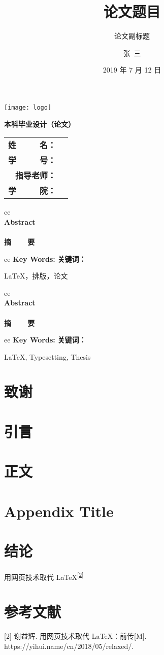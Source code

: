 \documentclass[12pt]{ctexrep}
\title{论文题目}
\subtitle{论文副标题}
\author{张\ 三}
\date{2019 年 7 月 12 日}
\makeatletter
\renewenvironment{abstract}[1]{
	\pagestyle{empty}
    \def\invalue{#1}
    \def\english{e}
    \begin{center}
        \ifx\invalue\english
        	{\Large \bfseries \@etitle} \\
        	\vspace{1.5em}
            {\LARGE \bfseries Abstract} \\
        \else
		    {\Large \bfseries \@title} \\
        	\vspace{1.5em}
            {\LARGE \bfseries 摘~~~~要} \\
        \fi
        \vspace{0.5em}
    \end{center}
}{
	\cleardoublepage
}
\newenvironment{keywords}[1]{
	\par
	\vspace{1cm}
	\noindent
	\def\invalue{#1}
	\def\english{e}
	\ifx\invalue\english
		{\bfseries Key Words: }
	\else
		{\bfseries 关键词： }
	\fi
}{}
\renewcommand{\maketitle}{
\begin{titlepage}
   \begin{center}
       \vspace*{1cm}\par
       {\Huge\bfseries \@title}\par
       \vspace{0.5cm}
       {\LARGE \@subtitle }\par
       \texttt{[image: logo]}\par
       \vspace{1.5cm}
       \vspace{1cm}
       {\LARGE \bfseries 本科毕业设计（论文）}\par
       \vspace{0.8cm}
	   \large
	   \begin{tabular}[h]{rc}
       \textbf{姓~~~~~名：} & \@author\\
	   \textbf{学~~~~~号：} & \@xuehao\\
	   \textbf{指导老师：} & \@supervisor\\
	   \textbf{学~~~~~院：} & \@college
	   \end{tabular}
	   \vfill
       \@date
   \end{center}
   \cleardoublepage
   \phantom{s}
   \thispagestyle{empty}
\end{titlepage}
}
\makeatother
\begin{document}
\maketitle

\begin{abstract}{c}
\zhlipsum[1]

\begin{keywords}{c}
\LaTeX{}，排版，论文
\end{keywords}
\end{abstract}

\begin{abstract}{e}
\lipsum[1]
\begin{keywords}{e}
\LaTeX{}, Typesetting, Thesis
\end{keywords}
\end{abstract}
 
\chapter*{致谢}
\zhlipsum[1]
 
\tableofcontents

\chapter{引言}
\zhlipsum[1-2]

\chapter{正文}
\zhlipsum[1-15]

\appendix
\chapter{Appendix Title}
\zhlipsum[1]

\chapter{结论}
用网页技术取代 \LaTeX{}\textsuperscript{{[}\protect\hyperlink{ref-weborlatex}{2}{]}}

\chapter*{参考文献}
\leavevmode\hypertarget{ref-weborlatex}{}%
{[}2{]} 谢益辉. 用网页技术取代 LaTeX：前传{[}M{]}.
https://yihui.name/cn/2018/05/relaxed/.
\end{document}

